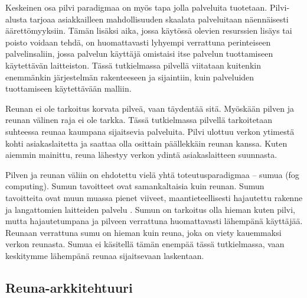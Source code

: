 Keskeinen osa pilvi paradigmaa on myös tapa jolla palveluita tuotetaan.
Pilvi-alusta tarjoaa asiakkailleen mahdollisuuden skaalata palveluitaan näennäisesti äärettömyyksiin.
Tämän lisäksi aika, jossa käytössä olevien resurssien lisäys tai poisto voidaan tehdä, on huomattavasti lyhyempi verrattuna perinteiseen palvelinsaliin, jossa palvelun käyttäjä omistaisi itse palvelun tuottamiseen käytettävän laitteiston.
Tässä tutkielmassa pilvellä viitataan kuitenkin enemmänkin järjestelmän rakenteeseen ja sijaintiin, kuin palveluiden tuottamiseen käytettävään malliin.

Reunan ei ole tarkoitus korvata pilveä, vaan täydentää sitä. Myöskään pilven ja reunan välinen raja ei ole tarkka. Tässä tutkielmassa pilvellä tarkoitetaan suhteessa reunaa kaumpana sijaitsevia palveluita. Pilvi ulottuu verkon ytimestä kohti asiakaslaitetta ja saattaa olla osittain päällekkäin reunan kanssa. Kuten aiemmin mainittu, reuna lähestyy verkon ydintä asiakaslaitteen suunnasta. 

Pilven ja reunan väliin on ehdotettu vielä yhtä toteutusparadigmaa – sumua (fog computing).
Sumun tavoitteet ovat samankaltaisia kuin reunan. Sumun tavoitteita ovat muun muassa pienet viiveet, maantieteellisesti hajautettu rakenne ja langattomien laitteiden palvelu \cite{bonomi2012fog}. Sumun on tarkoitus olla hieman kuten pilvi, mutta hajautetumpana ja pilveen verrattuna huomattavasti lähempänä käyttäjää. Reunaan verrattuna sumu on hieman kuin reuna, joka on viety kauemmaksi verkon reunasta.
Sumua ei käsitellä tämän enempää tässä tutkielmassa, vaan keskitymme lähempänä reunaa sijaitsevaan laskentaan.






\subsection{Reuna-arkkitehtuuri}


